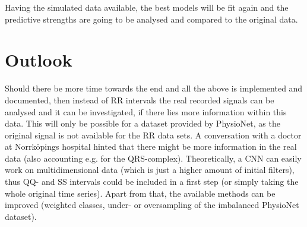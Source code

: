 \documentclass[11pt]{scrartcl}
\begin{document}
Having the simulated data available, the best models will be fit again and the predictive strengths are going to be analysed and compared to the original data.

\section{Outlook}

Should there be more time towards the end and all the above is implemented and documented, then instead of RR intervals the real recorded signals can be analysed and it can be investigated, if there lies more information within this data. This will only be possible for a dataset provided by PhysioNet, as the original signal is not available for the RR data sets. A conversation with a doctor at Norrköpings hospital hinted that there might be more information in the real data (also accounting e.g. for the QRS-complex). Theoretically, a CNN can easily work on multidimensional data (which is just a higher amount of initial filters), thus QQ- and SS intervals could be included in a first step (or simply taking the whole original time series). Apart from that, the available methods can be improved (weighted classes, under- or oversampling of the imbalanced PhysioNet dataset).
 
\end{document}
